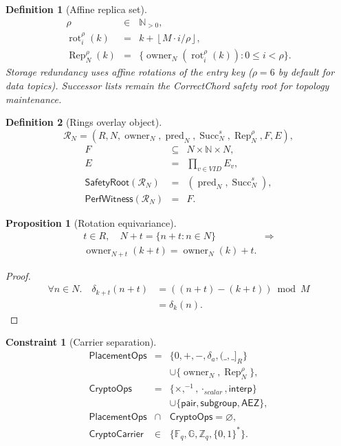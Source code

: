 \documentclass[journal]{IEEEtran}
\newtheorem{definition}{Definition}
\newtheorem{constraint}{Constraint}
\newtheorem{proposition}{Proposition}
\begin{document}
\begin{definition}[Affine replica set]
\[
\begin{array}{rcl}
\rho&\in&\mathbb{N}_{>0},\\
\operatorname{rot}^{\rho}_i(k)
  &=&k+\left\lfloor M\cdot i/\rho\right\rfloor,\\[4pt]
\operatorname{Rep}^{\rho}_N(k)
  &=&
  \{\operatorname{owner}_N(\operatorname{rot}^{\rho}_i(k)):
    0\leq i<\rho\}.
\end{array}
\]
Storage redundancy uses affine rotations of the entry key ($\rho=6$ by default
for data topics).  Successor lists remain the CorrectChord safety root for
topology maintenance.
\end{definition}

\begin{definition}[Rings overlay object]
\[
  \mathcal{R}_N=
  (R,N,\operatorname{owner}_N,\operatorname{pred}_N,
   \operatorname{Succ}^s_N,\operatorname{Rep}^{\rho}_N,F,E),
\]
\[
\begin{array}{rcl}
F&\subseteq&N\times\mathbb{N}\times N,\\
E&=&\prod_{v\in VID}E_v,\\
\mathsf{SafetyRoot}(\mathcal{R}_N)&=&
  (\operatorname{pred}_N,\operatorname{Succ}^s_N),\\
\mathsf{PerfWitness}(\mathcal{R}_N)&=&F.
\end{array}
\]
\end{definition}

\begin{proposition}[Rotation equivariance]
\[
\begin{aligned}
  t\in R,\quad N+t=\{n+t:n\in N\}
  &\Rightarrow\\
  \operatorname{owner}_{N+t}(k+t)=\operatorname{owner}_N(k)+t.
\end{aligned}
\]
\end{proposition}
\begin{proof}
\[
\begin{aligned}
  \forall n\in N.\quad
  \delta_{k+t}(n+t)
  &=((n+t)-(k+t))\bmod M\\
  &=\delta_k(n).
\end{aligned}
\]
\end{proof}

\begin{constraint}[Carrier separation]
\[
\begin{array}{rcl}
\mathsf{PlacementOps}&=&
  \{0,+,-,\delta_a,(\_,\_]_R\}\\
&&\cup\{\operatorname{owner}_N,\operatorname{Rep}^\rho_N\},\\
\mathsf{CryptoOps}&=&
  \{\times,^{-1},\cdot_{scalar},\mathsf{interp}\}\\
&&\cup\{\mathsf{pair},\mathsf{subgroup},\mathsf{AEZ}\},\\
\mathsf{PlacementOps}&\cap&\mathsf{CryptoOps}=\varnothing,\\
\mathsf{CryptoCarrier}&\in&\{\mathbb{F}_q,\mathbb{G},\mathbb{Z}_q,\{0,1\}^*\}.
\end{array}
\]
\end{constraint}
\end{document}
